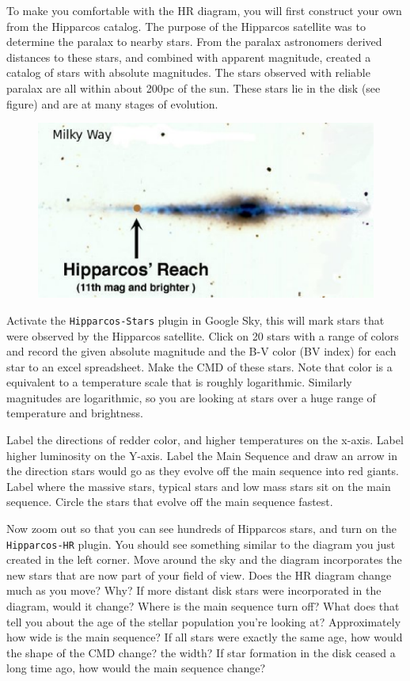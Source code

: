 \documentclass[12pt]{article}
\begin{document}
To make you comfortable with the HR diagram, you will first construct your own from the Hipparcos catalog. 
The purpose of the Hipparcos satellite was to determine the paralax to nearby stars. 
 From the paralax astronomers derived distances to these stars, and combined with apparent magnitude, created a catalog of stars with absolute magnitudes.
 The stars observed with reliable paralax are all within about 200pc of the sun.
 These stars lie in the disk (see figure) and are at many stages of evolution.
\begin{figure}[htp]
\centering
\includegraphics{hippinv}
\end{figure}



Activate the \texttt{Hipparcos-Stars} plugin in Google Sky, this will mark stars that were observed by the Hipparcos satellite. 
Click on 20 stars with a range of colors and record the given absolute magnitude and the B-V color (BV index) for each star to an excel spreadsheet.
 Make the CMD of these stars.
Note that color is a equivalent to a temperature scale that is roughly logarithmic. Similarly magnitudes are logarithmic, so you are looking at stars over a huge range of temperature and brightness. 

 Label the directions of redder color, and higher temperatures on the x-axis. Label higher luminosity on the Y-axis.
 Label the Main Sequence and draw an arrow in the direction stars would go as they evolve off the main sequence into red giants. Label where the massive stars, typical stars and low mass stars sit on the main sequence. Circle the stars that evolve off the main sequence fastest.

 Now zoom out so that you can see hundreds of Hipparcos stars, and turn on the \texttt{Hipparcos-HR} plugin. You should see something similar to the diagram you just created in the left corner. 
Move around the sky and the diagram incorporates the new stars that are now part of your field of view.
 Does the HR diagram change much as you move? Why?
 If more distant disk stars were incorporated in the diagram, would it change? 
Where is the main sequence turn off? What does that tell you about the age of the stellar population you're looking at?
 Approximately how wide is the main sequence? 
 If all stars were exactly the same age, how would the shape of the CMD change? the width?
 If star formation in the disk ceased a long time ago, how would the main sequence change? 
\end{document}
